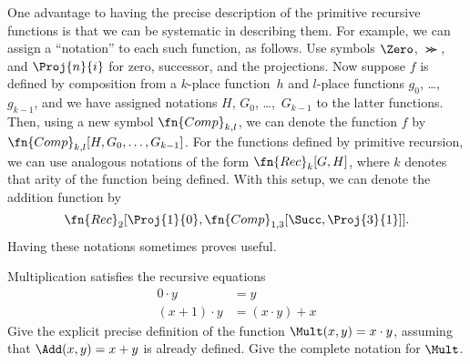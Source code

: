 \documentclass[../../../include/open-logic-section]{subfiles}
\begin{document}
\begin{explain}
One advantage to having the precise description of the primitive
recursive functions is that we can be systematic in describing them.
For example, we can assign a ``notation'' to each such function, as
follows. Use symbols $\Zero$, $\Succ$, and $\Proj{n}{i}$ for zero,
successor, and the projections. Now suppose $f$ is defined by
composition from a $k$-place function~$h$ and $l$-place functions $g_0$,
\dots,~$g_{k-1}$, and we have assigned notations $H$, $G_0$,
\dots,~$G_{k-1}$ to the latter functions. Then, using a new symbol
$\fn{Comp}_{k,l}$, we can denote the function $f$ by
$\fn{Comp}_{k,l}[H,G_0,\dots,G_{k-1}]$. For the functions defined by
primitive recursion, we can use analogous notations of the form
$\fn{Rec}_k[G,H]$, where $k$ denotes that arity of the function being
defined. With this setup, we can denote the addition function by
\[
\fn{Rec}_2[\Proj{1}{0},\fn{Comp}_{1,3}[\Succ,\Proj{3}{1}]].
\]
Having these notations sometimes proves useful.
\end{explain}

\begin{prob}
Multiplication satisfies the recursive equations
\begin{align*}
  0 \cdot y & = y\\
  (x+1) \cdot y & = (x \cdot y) + x
\end{align*}
Give the explicit precise definition of the function $\Mult(x, y) =
x\cdot y$, assuming that $\Add(x, y) = x + y$ is already defined. Give
the complete notation for $\Mult$.
\end{prob}
\end{document}
